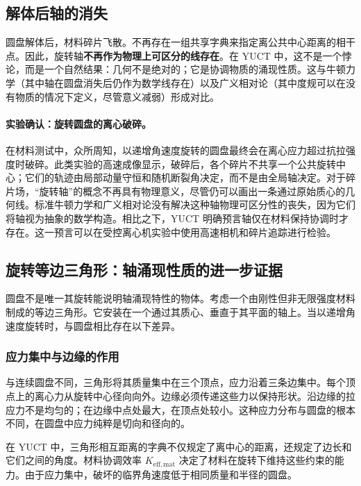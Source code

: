 \documentclass[12pt,a4paper]{article}
\begin{document}
	\subsection{解体后轴的消失}
	
	圆盘解体后，材料碎片飞散。不再存在一组共享字典来指定离公共中心距离的相干点。因此，旋转轴\textbf{不再作为物理上可区分的线存在}。在 YUCT 中，这不是一个悖论，而是一个自然结果：几何不是绝对的；它是协调物质的涌现性质。这与牛顿力学（其中轴在圆盘消失后仍作为数学线存在）以及广义相对论（其中度规可以在没有物质的情况下定义，尽管意义减弱）形成对比。
	
	\paragraph{实验确认：旋转圆盘的离心破碎。}
	在材料测试中，众所周知，以递增角速度旋转的圆盘最终会在离心应力超过抗拉强度时破碎。此类实验的高速成像显示，破碎后，各个碎片不共享一个公共旋转中心；它们的轨迹由局部动量守恒和随机断裂角决定，而不是由全局轴决定。对于碎片场，“旋转轴”的概念不再具有物理意义，尽管仍可以画出一条通过原始质心的几何线。标准牛顿力学和广义相对论没有解决这种轴物理可区分性的丧失，因为它们将轴视为抽象的数学构造。相比之下，YUCT 明确预言轴仅在材料保持协调时才存在。这一预言可以在受控离心机实验中使用高速相机和碎片追踪进行检验。
	
	\subsection{旋转等边三角形：轴涌现性质的进一步证据}
	
	圆盘不是唯一其旋转能说明轴涌现特性的物体。考虑一个由刚性但非无限强度材料制成的等边三角形。它安装在一个通过其质心、垂直于其平面的轴上。当以递增角速度旋转时，与圆盘相比存在以下差异。
	
	\subsubsection{应力集中与边缘的作用}
	
	与连续圆盘不同，三角形将其质量集中在三个顶点，应力沿着三条边集中。每个顶点上的离心力从旋转中心径向向外。边缘必须传递这些力以保持形状。沿边缘的拉应力不是均匀的；在边缘中点处最大，在顶点处较小。这种应力分布与圆盘的根本不同，在圆盘中应力纯粹是切向和径向的。
	
	在 YUCT 中，三角形相互距离的字典不仅规定了离中心的距离，还规定了边长和它们之间的角度。材料协调效率 \(K_{\mathrm{eff,mat}}\) 决定了材料在旋转下维持这些约束的能力。由于应力集中，破坏的临界角速度低于相同质量和半径的圆盘。
	
\end{document}
